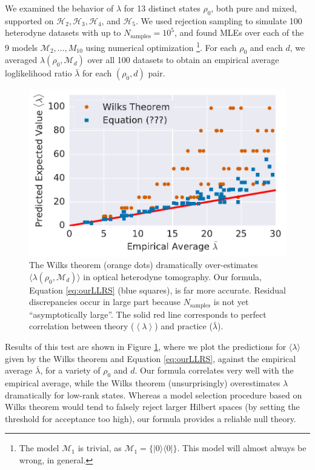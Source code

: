 \documentclass[aps,pra, twocolumn]{revtex4-1}
\newcommand{\M}{\mathcal{M}}
\newcommand{\expect}[1]{\ensuremath{\left\langle#1\right\rangle}}
\begin{document}
We examined the behavior of $\lambda$ for 13 distinct states $\rho_{0}$, both pure and mixed, supported on $\mathcal{H}_{2}, \mathcal{H}_{3}, \mathcal{H}
_{4}$, and $\mathcal{H}_{5}$.  We used rejection sampling to simulate 100 heterodyne datasets with up to $N_{\mathrm{samples}}=10^5$, and found MLEs over each of the 9 models $\M_2, \ldots, M_{10}$ using numerical optimization \footnote{The model $\M_{1}$ is trivial, as $\M_{1} = \{|0\rangle \langle 0|\}$. This model will almost always be wrong, in general.}.  For each $\rho_{0}$ and each $d$, we averaged $\lambda(\rho_{0}, \M_{d})$ over all 100 datasets to obtain an empirical average loglikelihood ratio $\bar{\lambda}$ for each $(\rho_0,d)$ pair.

\begin{figure}[h]
 \includegraphics[width=\columnwidth]{Images/Figure_8.pdf}
 \caption{The Wilks theorem (orange dots) dramatically over-estimates $\langle\lambda(\rho_{0}, \M_{d})\rangle$ in optical heterodyne tomography. Our formula, Equation \ref{eq:ourLLRS} (blue squares), is far more accurate. Residual discrepancies occur in large part because $N_{\mathrm{samples}}$ is not yet ``asymptotically large''. The solid red line corresponds to perfect correlation between theory ($\expect{\lambda}$) and practice ($\bar\lambda$).}
 \label{fig:modelcomp}
\end{figure}

Results of this test are shown in Figure \ref{fig:modelcomp}, where we plot the predictions for $\langle \lambda \rangle$ given by the Wilks theorem and Equation \eqref{eq:ourLLRS}, against the empirical average $\bar\lambda$, for a variety of $\rho_{0}$ and $d$. Our formula correlates very well with the empirical average, while the Wilks theorem (unsurprisingly) overestimates $\lambda$ dramatically for low-rank states.  Whereas a model selection procedure based on Wilks theorem would tend to falsely reject larger Hilbert spaces (by setting the threshold for acceptance too high), our formula provides a reliable null theory.
\end{document}
